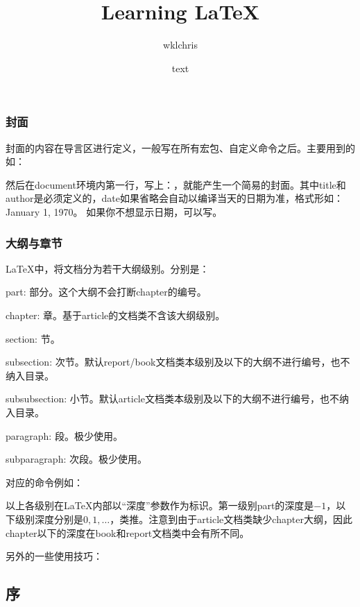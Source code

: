 {\subsection{封面}
封面的内容在导言区进行定义，一般写在所有宏包、自定义命令之后。主要用到的如：
\begin{latex}{}
\title{Learning LaTeX}
\author{wklchris}
\date{text}
\end{latex}

然后在document环境内第一行，写上：\latexline{\\maketitle}，就能产生一个简易的封面。其中title和author是必须定义的，date如果省略会自动以编译当天的日期为准，格式形如：January 1, 1970。 如果你不想显示日期，可以写\latexline{\\date{}}。

\subsection{大纲与章节}
\LaTeX 中，将文档分为若干大纲级别。分别是：
\begin{para}
\item[\char92{}part:] 部分。这个大纲不会打断chapter的编号。
\item[\char92{}chapter:] 章。基于article的文档类不含该大纲级别。
\item[\char92{}section:] 节。
\item[\char92{}subsection:] 次节。默认report/book文档类本级别及以下的大纲不进行编号，也不纳入目录。
\item[\char92{}subsubsection:] 小节。默认article文档类本级别及以下的大纲不进行编号，也不纳入目录。
\item[\char92{}paragraph:] 段。极少使用。
\item[\char92{}subparagraph:] 次段。极少使用。
\end{para}

对应的命令例如：

以上各级别在\LaTeX 内部以“深度”参数作为标识。第一级别part的深度是$-1$，以下级别深度分别是$0,1,\ldots$，类推。注意到由于article文档类缺少chapter大纲，因此chapter以下的深度在book和report文档类中会有所不同。\dpar

另外的一些使用技巧：
\begin{latex}{}
\setcounter{tocdepth}{2}
\chapter*{序}

\end{latex}}
